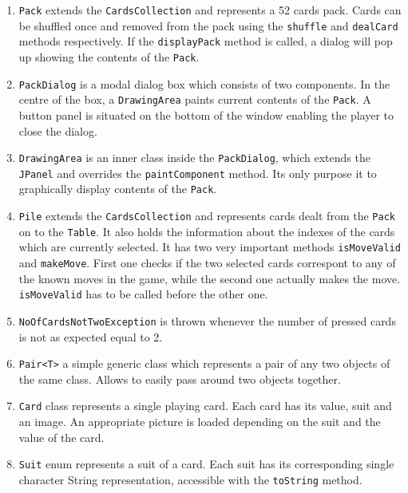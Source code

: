 \documentclass[a4paper, 12pt, titlepage]{article}
\begin{document}
\begin{enumerate}
	\item \texttt{Pack} extends the \texttt{CardsCollection} and represents a 52 cards 
		pack. Cards can be shuffled once and removed from the pack using the 
		\texttt{shuffle} and \texttt{dealCard} methods respectively. If the 
		\texttt{displayPack} method is called, a dialog will pop up showing the contents 
		of the \texttt{Pack}.
	
	\item \texttt{PackDialog} is a modal dialog box which consists of two components. 
		In the centre of the box, a \texttt{DrawingArea} paints current contents of the
		\texttt{Pack}. A button panel is situated on the bottom of the window enabling
		the player to close the dialog.  
	
	\item \texttt{DrawingArea} is an inner class inside the \texttt{PackDialog}, which 
		extends the \texttt{JPanel} and overrides the \texttt{paintComponent} method. Its
		only purpose it to graphically display contents of the \texttt{Pack}.		
	
	\item \texttt{Pile} extends the \texttt{CardsCollection} and represents cards 
		dealt from the \texttt{Pack} on to the \texttt{Table}. It also holds the 
		information about the indexes of the cards which are currently selected. It has 
		two very important methods \texttt{isMoveValid} and \texttt{makeMove}. First one 
		checks if the two selected cards correspont to any of the known moves in the 
		game, while the second one actually makes the move. \texttt{isMoveValid} has to 
		be called before the other one. 

	\item \texttt{NoOfCardsNotTwoException} is thrown whenever the number of pressed 
		cards is not as expected equal to 2. 
	
	\item \texttt{Pair<T>} a simple generic class which represents a pair of any two 
		objects of the same class. Allows to easily pass around two objects together.

	\item \texttt{Card} class represents a single playing card. Each card has its value, 
		suit and an image. An appropriate picture is loaded depending on the suit and
		the value of the card. 
	
	\item \texttt{Suit} enum represents a suit of a card. Each suit has its corresponding
		single character String representation, accessible with the \texttt{toString} 
		method.
	

\end{enumerate}
\end{document}

